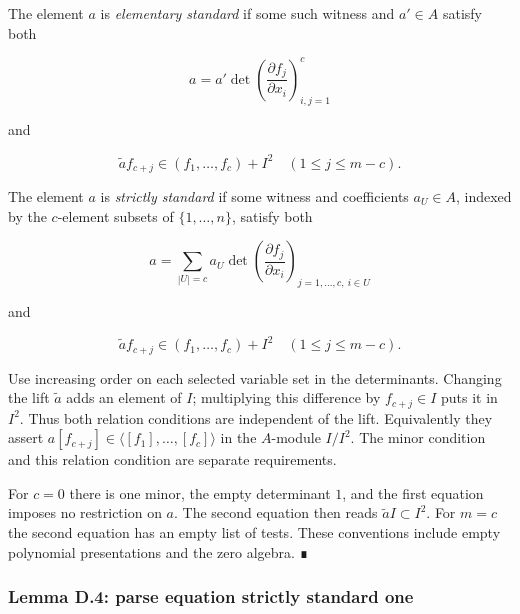 \documentclass[11pt,a4paper,openany]{report}
\begin{document}
The element \(a\) is \emph{elementary standard} if some such witness and \(a'\in A\) satisfy both

\label{AG-RG-S05-equation-elementary-standard-one}

\[a=a'\det\left(\frac{\partial f_j}{\partial x_i}\right)_{i,j=1}^{c}\tag{D.3e1}\]

and

\label{AG-RG-S05-equation-elementary-standard-two}

\[\widetilde a f_{c+j}\in(f_1,\ldots,f_c)+I^2\quad(1\leq j\leq m-c).\tag{D.3e2}\]

The element \(a\) is \emph{strictly standard} if some witness and coefficients \(a_U\in A\), indexed by the \(c\)-element subsets of \(\{1,\ldots,n\}\), satisfy both

\label{AG-RG-S05-equation-strictly-standard-one}

\[a=\sum_{|U|=c}a_U\det\left(\frac{\partial f_j}{\partial x_i}\right)_{j=1,\ldots,c,\ i\in U}\tag{D.3s1}\]

and

\label{AG-RG-S05-equation-strictly-standard-two}

\[\widetilde a f_{c+j}\in(f_1,\ldots,f_c)+I^2\quad(1\leq j\leq m-c).\tag{D.3s2}\]

Use increasing order on each selected variable set in the determinants. Changing the lift \(\widetilde a\) adds an element of \(I\); multiplying this difference by \(f_{c+j}\in I\) puts it in \(I^2\). Thus both relation conditions are independent of the lift. Equivalently they assert \(a[f_{c+j}]\in\langle[f_1],\ldots,[f_c]\rangle\) in the \(A\)-module \(I/I^2\). The minor condition and this relation condition are separate requirements.

For \(c=0\) there is one minor, the empty determinant \(1\), and the first equation imposes no restriction on \(a\). The second equation then reads \(\widetilde a I\subset I^2\). For \(m=c\) the second equation has an empty list of tests. These conventions include empty polynomial presentations and the zero algebra. ∎

\label{AG-RG-S05-smoothing-lemma-parse-equation-strictly-standard-one}

\subsubsection{Lemma D.4: parse equation strictly standard one}\label{AG-RG-S05-lemma-d.4-parse-equation-strictly-standard-one}
\end{document}
